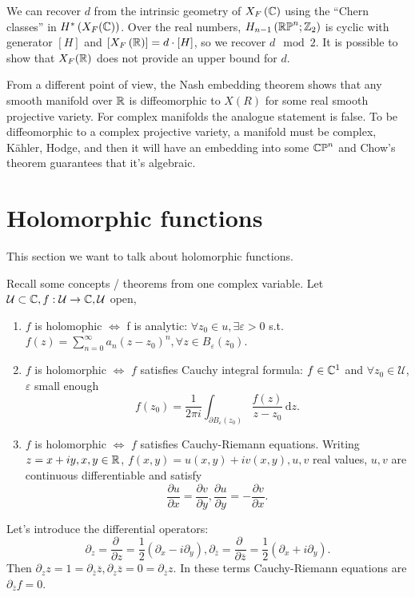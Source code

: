 We can recover $d$ from the intrinsic geometry of $X_F\left( \mathbb{C} \right) $ using the ``Chern classes'' in $H^{*}\left( X_F(\mathbb{C}) \right) $. Over the real numbers, $H_{n-1}\left( \mathbb{RP}^{n};\mathbb{Z}_2 \right) $ is cyclic with generator $\left[ H \right] $ and $\left[ X_F\left( \mathbb{R} \right)  \right] =d\cdot \left[ H \right] $, so we recover $d \mod 2$. 
It is possible to show that $X_F(\mathbb{R})$ does not provide an upper bound for $d$.

From a different point of view, the Nash embedding theorem shows that any smooth manifold over $\mathbb{R}$ is diffeomorphic to $X(R)$ for some real smooth projective variety.
For complex manifolds the analogue statement is false. To be diffeomorphic to a complex projective variety, a manifold must be complex, K\"{a}hler, Hodge, and then it will have an embedding into some $\mathbb{CP}^{n}$ and Chow's theorem guarantees that it's algebraic.

\section{Holomorphic functions}
This section we want to talk about holomorphic functions.

Recall some concepts / theorems from one complex variable. Let   $\mathcal{U}\subset \mathbb{C}, f:\mathcal{U}\to \mathbb{C}, \mathcal{U}$ open,
\begin{enumerate}
  \item $f$ is holomophic $\Leftrightarrow$ f is analytic: $\forall  z_0 \in  u, \exists \varepsilon >0$ s.t. $f(z)=\sum_{n=0}^{\infty} a_n (z-z_0)^n,\forall z\in B_{\varepsilon }(z_0)$.
  \item  $f$ is holomorphic $\Leftrightarrow$ $f$ satisfies Cauchy integral formula: $f\in \mathbb{C}^{1}$ and $\forall z_0 \in  \mathcal{U}$, $\varepsilon $ small enough 
    \[
      f(z_0)=\frac{1}{2\pi i}\int_{\partial B_\varepsilon (z_0)}\frac{ f(z)}{z-z_0}\,\mathrm{d}z.
    \] 
  \item $f$ is holomorphic $\Leftrightarrow$ $f$ satisfies Cauchy-Riemann equations. Writing $z=x+iy,x,y\in \mathbb{R}$, $f(x,y)=u(x,y)+iv(x,y), u,v$ real values, $u,v$ are continuous differentiable and satisfy
    \[
    \frac{\partial u}{\partial x} =\frac{\partial v}{\partial y},  \frac{\partial u}{\partial y} =-\frac{\partial v}{\partial x} . 
    \] 
\end{enumerate}

Let's introduce the differential operators:
\[
  \partial_z=\frac{\partial ~}{\partial z} =\frac{1}{2}\left( \partial_x-i\partial_y \right) ,\partial_{\overline{z}}=\frac{\partial ~}{\partial \overline{z}} =\frac{1}{2}\left( \partial_x+i\partial_y \right) .
\] 	
Then $\partial_z z=1=\partial_{\overline{z}}\overline{z},\partial_z\overline{z}=0=\partial_{\overline{z}}z$. In these terms Cauchy-Riemann equations are $\partial_{\overline{z}}f=0$.

